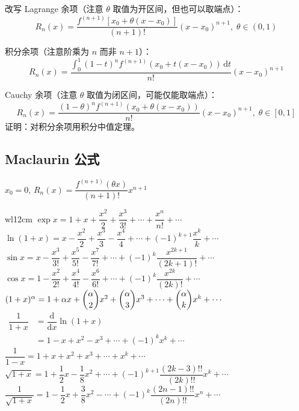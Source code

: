 \documentclass[12pt, a4paper, UTF8, openany]{ctexbook}
\newcommand{\dif}{\mathrm{d}}
\newcommand{\difk}[2]{{#1}^{(#2)}}
\begin{document}
        改写 Lagrange 余项（注意 $\theta$ 取值为开区间，但也可以取端点）：
        $$R_n(x) = \dfrac{\difk{f}{n + 1}\left[x_0 + \theta(x - x_0)\right]}{(n + 1)!}(x - x_0)^{n + 1}, \; \theta \in (0, 1)$$

        积分余项（注意阶乘为 $n$ 而非 $n + 1$）：
        $$R_n(x) = \dfrac{\int_{0}^{1} (1 - t)^n\difk{f}{n + 1}(x_0 + t(x - x_0))\,\dif t}{n!} (x - x_0)^{n + 1}$$

        Cauchy 余项（注意 $\theta$ 取值为闭区间，可能仅能取端点）：
        $$R_n(x) = \dfrac{(1 - \theta)^n\difk{f}{n + 1}(x_0 + \theta(x - x_0))}{n!}(x - x_0)^{n + 1}, \; \theta \in [0, 1]$$
        证明：对积分余项用积分中值定理。

        \subsection{Maclaurin 公式}
        $x_0 = 0, \, R_n(x) = \dfrac{\difk{f}{n + 1}(\theta x)}{(n + 1)!}x^{n + 1}$

        \begin{longtable}[h]{w{l}{12cm}}
            $\exp x = 1 + x + \dfrac{x^2}{2} + \dfrac{x^3}{3!} + \cdots + \dfrac{x^n}{n!} + \cdots$ \\
            \addlinespace
            $\ln(1 + x) = x - \dfrac{x^2}{2} + \dfrac{x^3}{3} - \dfrac{x^4}{4} 
                + \cdots + (-1)^{k + 1}\dfrac{x^k}{k} + \cdots$ \\
            \midrule
            $\sin x = x - \dfrac{x^3}{3!} + \dfrac{x^5}{5!} - \dfrac{x^7}{7!} 
                        + \cdots + (-1)^{k}\dfrac{x^{2k + 1}}{(2k + 1)!} + \cdots$ \\
            \addlinespace
            $\cos x = 1 - \dfrac{x^2}{2!} + \dfrac{x^4}{4!} - \dfrac{x^6}{6!}
                        + \cdots + (-1)^{k}\dfrac{x^{2k}}{(2k)!} + \cdots$ \\
            \midrule
            $(1 + x)^\alpha = 1 + \alpha x + \dbinom{\alpha}{2}x^2 + \dbinom{\alpha}{3}x^3 
                + \cdots + \dbinom{\alpha}{k}x^k + \cdots$ \\
            \midrule
            $\begin{aligned}
                \dfrac{1}{1 + x} &= \dfrac{\dif}{\dif x}\ln(1 + x) \\
                    &= 1 - x + x^2 - x^3 + \cdots + (-1)^kx^k + \cdots
            \end{aligned}$ \\
            $\dfrac{1}{1 - x} = 1 + x + x^2 + x^3 + \cdots + x^k + \cdots$ \\
            \addlinespace
            $\sqrt{1 + x} = 1 + \dfrac{1}{2}x - \dfrac{1}{8}x^2 + \cdots 
                + (-1)^{k + 1}\dfrac{(2k - 3)!!}{(2k)!!}x^k + \cdots$ \\
            \addlinespace
            $\dfrac{1}{\sqrt{1 + x}} = 1 - \dfrac{1}{2}x + \dfrac{3}{8}x^2 
                - \cdots + (-1)^k\dfrac{(2n - 1)!!}{(2n)!!}x^n + \cdots$
        \end{longtable}
        
\end{document}
